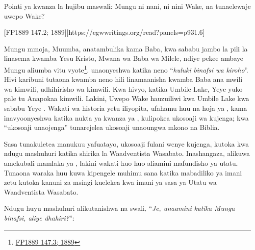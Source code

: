 
Pointi ya kwanza la  hujibu maswali: Mungu ni nani, ni nini  Wake, na tunaelewaje uwepo Wake?

[FP1889 147.2; 1889][https://egwwritings.org/read?panels=p931.6]

Mungu mmoja, Muumba, anatambulika kama Baba, kwa sababu jambo la pili la  linasema kwamba Yesu Kristo, Mwana wa Baba wa Milele, ndiye pekee ambaye Mungu aliumba vitu vyote\footnote{\href{https://egwwritings.org/?ref=en_FP1889.147.3&para=931.7}{FP1889 147.3; 1889}}.  unaonyeshwa katika neno “\textit{huluki binafsi wa kiroho}”. Hivi karibuni tutaona kwamba neno hili linamaanisha kwamba Baba ana mwili wa kimwili, udhihirisho wa kimwili. Kwa hivyo, katika Umbile Lake, Yeye yuko pale tu Anapokaa kimwili. Lakini, Uwepo Wake hauzuiliwi kwa Umbile Lake kwa sababu Yeye . Wakati wa historia yetu iliyopita, ufahamu huu na hoja ya , kama inavyoonyeshwa katika nukta ya kwanza ya , kulipokea ukosoaji wa kujenga; kwa “ukosoaji unaojenga” tunarejelea ukosoaji unaoungwa mkono na Biblia.

Sasa tunakuletea manukuu yafuatayo, ukosoaji fulani wenye kujenga, kutoka kwa ndugu mashuhuri katika shirika la Waadventista Wasabato. Inashangaza, alikuwa amekubali mamlaka ya , lakini wakati huo huo aliamini mafundisho ya utatu. Tunaona waraka huu kuwa kipengele muhimu sana katika mabadiliko ya imani zetu kutoka kanuni za msingi kuelekea kwa imani ya sasa ya Utatu wa Waadventista Wasabato.

Ndugu huyu mashuhuri alikutanishwa na swali, “\textit{Je, unaamini katika Mungu binafsi, aliye dhahiri?}”:


